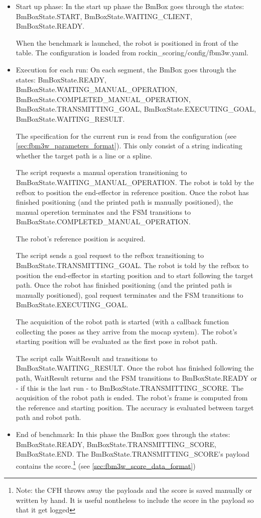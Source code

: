 \documentclass[a4paper]{article}
\begin{document}
\begin{itemize}
  \item Start up phase:
In the start up phase the BmBox goes through the states: BmBoxState.START, BmBoxState.WAITING\_CLIENT, BmBoxState.READY.

When the benchmark is launched, the robot is positioned in front of the table.
The configuration is loaded from rockin\_scoring/config/fbm3w.yaml.

  \item Execution for each run:
On each segment, the BmBox goes through the states: BmBoxState.READY, BmBoxState.WAITING\_MANUAL\_OPERATION, BmBoxState.COMPLETED\_MANUAL\_OPERATION, BmBoxState.TRANSMITTING\_GOAL, BmBoxState.EXECUTING\_GOAL, BmBoxState.WAITING\_RESULT.

The specification for the current run is read from the configuration (see \ref{sec:fbm3w_parameters_format}).
This only consist of a string indicating whether the target path is a line or a spline.

The script requests a manual operation transitioning to BmBoxState.WAITING\_MANUAL\_OPERATION.
The robot is told by the refbox to position the end-effector in reference position.
Once the robot has finished positioning (and the printed path is manually positioned), the manual operetion terminates and the FSM transitions to BmBoxState.COMPLETED\_MANUAL\_OPERATION.

The robot's reference position is acquired.

The script sends a goal request to the refbox transitioning to BmBoxState.TRANSMITTING\_GOAL.
The robot is told by the refbox to position the end-effector in starting position and to start following the target path.
Once the robot has finished positioning (and the printed path is manually positioned), goal request terminates and the FSM transitions to BmBoxState.EXECUTING\_GOAL.

The acquisition of the robot path is started (with a callback function collecting the poses as they arrive from the mocap system).
The robot's starting position will be evaluated as the first pose in robot path.

The script calls WaitResult and transitions to BmBoxState.WAITING\_RESULT.
Once the robot has finished following the path, WaitResult returns and the FSM transitions to BmBoxState.READY or - if this is the last run - to BmBoxState.TRANSMITTING\_SCORE.
The acquisition of the robot path is ended.
The robot's frame is computed from the reference and starting position.
The accuracy is evaluated between target path and robot path.

  \item End of benchmark:
In this phase the BmBox goes through the states: BmBoxState.READY, BmBoxState.TRANSMITTING\_SCORE, BmBoxState.END.
The BmBoxState.TRANSMITTING\_SCORE's payload contains the score.\footnote{Note: the CFH throws away the payloads and the score is saved manually or written by hand. It is useful nontheless to include the score in the payload so that it get logged} (see \ref{sec:fbm3w_score_data_format})
\end{itemize}
\end{document}
